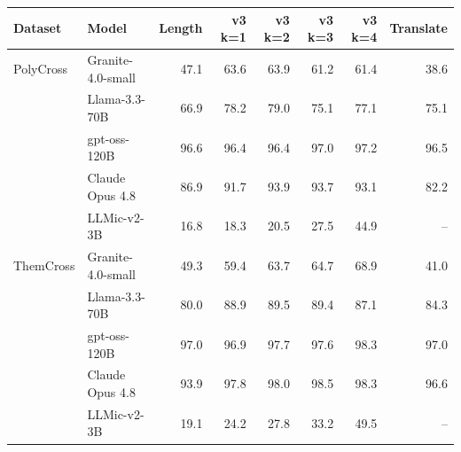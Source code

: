 \begin{tabular}{llrrrrrr}
\toprule
Dataset & Model & Length & v3 k=1 & v3 k=2 & v3 k=3 & v3 k=4 & Translate \\
\midrule
PolyCross & Granite-4.0-small & 47.1 & 63.6 & 63.9 & 61.2 & 61.4 & 38.6 \\
 & Llama-3.3-70B & 66.9 & 78.2 & 79.0 & 75.1 & 77.1 & 75.1 \\
 & gpt-oss-120B & 96.6 & 96.4 & 96.4 & 97.0 & 97.2 & 96.5 \\
 & Claude Opus 4.8 & 86.9 & 91.7 & 93.9 & 93.7 & 93.1 & 82.2 \\
 & LLMic-v2-3B & 16.8 & 18.3 & 20.5 & 27.5 & 44.9 & -- \\
\midrule
ThemCross & Granite-4.0-small & 49.3 & 59.4 & 63.7 & 64.7 & 68.9 & 41.0 \\
 & Llama-3.3-70B & 80.0 & 88.9 & 89.5 & 89.4 & 87.1 & 84.3 \\
 & gpt-oss-120B & 97.0 & 96.9 & 97.7 & 97.6 & 98.3 & 97.0 \\
 & Claude Opus 4.8 & 93.9 & 97.8 & 98.0 & 98.5 & 98.3 & 96.6 \\
 & LLMic-v2-3B & 19.1 & 24.2 & 27.8 & 33.2 & 49.5 & -- \\
\bottomrule
\end{tabular}
